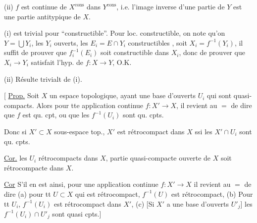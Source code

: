 (ii) $f$ est continue de $X^{\mathrm{cons}}$ dans $Y^{\mathrm{cons}}$, i.e. l'image inverse d'une partie   de $Y$ est une partie  antitypique de $X$.

 (i) est trivial pour ``constructible''. Pour loc. constructible, on note qu'on  $Y=\bigcup Y_i$, les $Y_i$ ouverts, les $E_i=E\cap Y_i$ constructibles , soit $X_i=f^{-1}(Y_i)$,  il suffit de prouver que $f_i^{-1}(E_i)$ soit constructible dans $X_i$, donc de prouver que  $X_i\to Y_i$ satisfait l'hyp. de $f:X\longrightarrow Y$,  O.K.

(ii) Résulte trivialt de (i).

[ \uline{Prop.} Soit $X$ un espace topologique, ayant une base d'ouverts $U_i$ qui sont quasi-compacts. Alors pour tte  application continue $f:X'\to X$, il revient au $=$ de dire que $f$ est qu. cpt, ou que les $f^{-1}(U_i)$ sont qu. cpts.

Donc si $X'\subset X$ sous-espace top., $X'$ est rétrocompact dans $X$ ssi les $X'\cap U_i$ sont qu. cpts.

\uline{Cor.}   les $U_i$ rétrocompacts dans $X$,    partie quasi-compacte ouverte de $X$ soit rétrocompacte dans $X$.

\uline{Cor} S'il en est ainsi, pour une  application continue $f:X'\to X$ il revient au $=$ de dire  (a) pour tt  $U\subset X$ qui est rétrocompact, $f^{-1}(U)$ est rétrocompact, (b) Pour tt $U_i$, $f^{-1}(U_i)$ est rétrocompact dans $X'$, (c) [Si $X'$ a une base d'ouverts  $U'_j$] les $f^{-1}(U_i)\cap U'_j$ sont  quasi cpts.]

